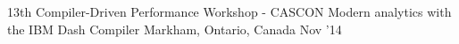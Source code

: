 \begin{cventries}
\cventry
  {13th Compiler-Driven Performance Workshop - CASCON}
  {Modern analytics with the IBM Dash Compiler}
  {Markham, Ontario, Canada}
  {Nov '14}
  {}
\end{cventries}
